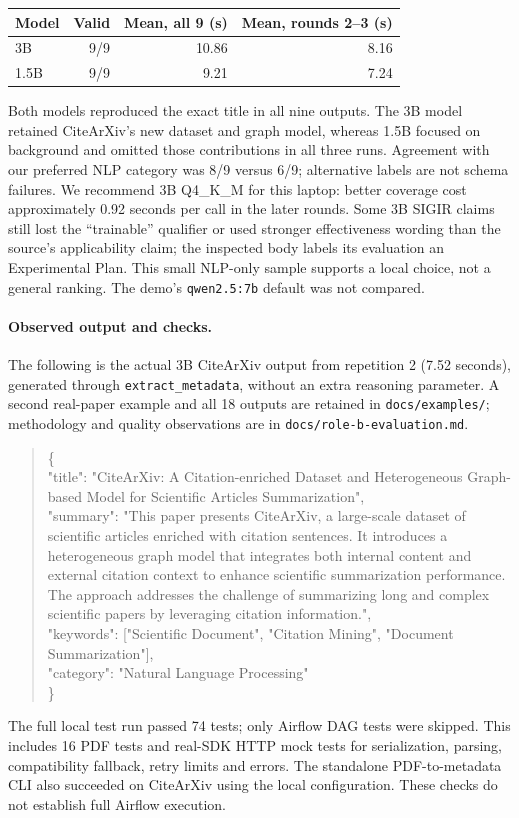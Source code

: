\begin{center}
\small
\begin{tabular}{lrrr}
Model & Valid & Mean, all 9 (s) & Mean, rounds 2--3 (s) \\
\hline
3B & 9/9 & 10.86 & 8.16 \\
1.5B & 9/9 & 9.21 & 7.24 \\
\end{tabular}
\end{center}

Both models reproduced the exact title in all nine outputs. The 3B
model retained CiteArXiv's new dataset and graph model, whereas 1.5B
focused on background and omitted those contributions in all three
runs. Agreement with our preferred NLP category was 8/9 versus 6/9;
alternative labels are not schema failures. We recommend 3B Q4\_K\_M
for this laptop: better coverage cost approximately 0.92 seconds per
call in the later rounds. Some 3B SIGIR claims still lost the ``trainable'' qualifier
or used stronger effectiveness wording than the source's applicability
claim; the inspected body labels its evaluation an Experimental Plan. This small NLP-only sample supports a local choice, not a general
ranking. The demo's \texttt{qwen2.5:7b} default
was not compared.

\paragraph{Observed output and checks.}
The following is the actual 3B CiteArXiv output from repetition 2
(7.52 seconds), generated through \texttt{extract\_metadata}, without
an extra reasoning parameter. A second real-paper example and all
18 outputs are retained in \texttt{docs/examples/}; methodology and
quality observations are in \texttt{docs/role-b-evaluation.md}.

\begin{quote}
\small\ttfamily\raggedright
\{\\
"title": "CiteArXiv: A Citation-enriched Dataset and Heterogeneous Graph-based Model for Scientific Articles Summarization",\\
"summary": "This paper presents CiteArXiv, a large-scale dataset of scientific articles enriched with citation sentences. It introduces a heterogeneous graph model that integrates both internal content and external citation context to enhance scientific summarization performance. The approach addresses the challenge of summarizing long and complex scientific papers by leveraging citation information.",\\
"keywords": ["Scientific Document", "Citation Mining",
"Document Summarization"],\\
"category": "Natural Language Processing"\\
\}
\end{quote}

The full local test run passed 74 tests; only Airflow DAG tests were
skipped. This includes 16 PDF tests and real-SDK HTTP mock tests for
serialization, parsing, compatibility fallback, retry limits and errors.
The standalone PDF-to-metadata CLI also succeeded on CiteArXiv using
the local configuration. These checks do not establish full Airflow
execution.
